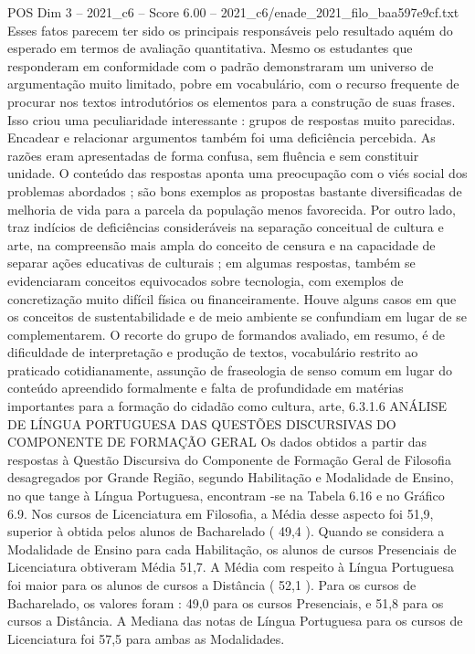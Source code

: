 \begin{textsample}{POS Dim 3 – 2021\_c6 – Score 6.00 – 2021\_c6/enade\_2021\_filo\_baa597e9cf.txt}
Esses fatos parecem ter sido os principais responsáveis pelo resultado aquém do esperado em termos de avaliação quantitativa.
Mesmo os estudantes que responderam em conformidade com o padrão demonstraram um universo de argumentação muito limitado, pobre em vocabulário, com o recurso frequente de procurar nos textos introdutórios os elementos para a construção de suas frases.
Isso criou uma peculiaridade interessante : grupos de respostas muito parecidas.
Encadear e relacionar argumentos também foi uma deficiência percebida.
As razões eram apresentadas de forma confusa, sem fluência e sem constituir unidade.
O conteúdo das respostas aponta uma preocupação com o viés social dos problemas abordados ; são bons exemplos as propostas bastante diversificadas de melhoria de vida para a parcela da população menos favorecida.
Por outro lado, traz indícios de deficiências consideráveis na separação conceitual de cultura e arte, na compreensão mais ampla do conceito de censura e na capacidade de separar ações educativas de culturais ; em algumas respostas, também se evidenciaram conceitos equivocados sobre tecnologia, com exemplos de concretização muito difícil física ou financeiramente.
Houve alguns casos em que os conceitos de sustentabilidade e de meio ambiente se confundiam em lugar de se complementarem.
O recorte do grupo de formandos avaliado, em resumo, é de dificuldade de interpretação e produção de textos, vocabulário restrito ao praticado cotidianamente, assunção de fraseologia de senso comum em lugar do conteúdo apreendido formalmente e falta de profundidade em matérias importantes para a formação do cidadão como cultura, arte, 6.3.1.6 ANÁLISE DE LÍNGUA PORTUGUESA DAS QUESTÕES DISCURSIVAS DO COMPONENTE DE FORMAÇÃO GERAL Os dados obtidos a partir das respostas à Questão Discursiva do Componente de Formação Geral de Filosofia desagregados por Grande Região, segundo Habilitação e Modalidade de Ensino, no que tange à Língua Portuguesa, encontram -se na Tabela 6.16 e no Gráfico 6.9.
Nos cursos de Licenciatura em Filosofia, a Média desse aspecto foi 51,9, superior à obtida pelos alunos de Bacharelado ( 49,4 ).
Quando se considera a Modalidade de Ensino para cada Habilitação, os alunos de cursos Presenciais de Licenciatura obtiveram Média 51,7.
A Média com respeito à Língua Portuguesa foi maior para os alunos de cursos a Distância ( 52,1 ).
Para os cursos de Bacharelado, os valores foram : 49,0 para os cursos Presenciais, e 51,8 para os cursos a Distância.
A Mediana das notas de Língua Portuguesa para os cursos de Licenciatura foi 57,5 para ambas as Modalidades.

\end{textsample}
